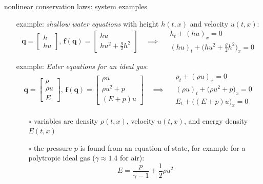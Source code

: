 \documentclass[10pt,hyperref,dvipsnames]{beamer}
\newcommand{\bbf}{\mathbf{f}}
\newcommand{\bq}{\mathbf{q}}
\begin{document}
\begin{frame}{nonlinear conservation laws: system examples}

\begin{itemize}
\setlength{\itemindent}{11mm}
\item[example:] \emph{shallow water equations} with height $h(t,x)$ and velocity $u(t,x)$:
        $$\bq = \begin{bmatrix} h \\ hu \end{bmatrix}, \, \bbf(\bq) = \begin{bmatrix} hu \\ h u^2 + \frac{g}{2} h^2 \end{bmatrix} \quad \implies \quad \begin{matrix} h_t + (hu)_x = 0 \\ (hu)_t + \Big(h u^2 + \frac{g}{2} h^2\Big)_x = 0 \end{matrix}$$
\item[example:] \emph{Euler equations for an ideal gas}:
        $$\bq = \begin{bmatrix} \rho \\ \rho u \\ E \end{bmatrix}, \, \bbf(\bq) = \begin{bmatrix} \rho u \\ \rho u^2 + p \\ (E+p) u \end{bmatrix} \quad \implies \quad \begin{matrix} \rho_t + (\rho u)_x = 0 \\ (\rho u)_t + \Big(\rho u^2 + p\Big)_x = 0 \\ E_t + \Big((E+p) u\Big)_x = 0 \end{matrix}$$
    \begin{itemize}
    \item[$\circ$] variables are density $\rho(t,x)$, velocity $u(t,x)$, and energy density $E(t,x)$
    \item[$\circ$] the pressure $p$ is found from an equation of state, for example for a polytropic ideal gas ($\gamma \approx 1.4$ for air):
        $$E = \frac{p}{\gamma - 1} + \frac{1}{2} \rho u^2$$
    \end{itemize}
\end{itemize}
\end{frame}
\end{document}
